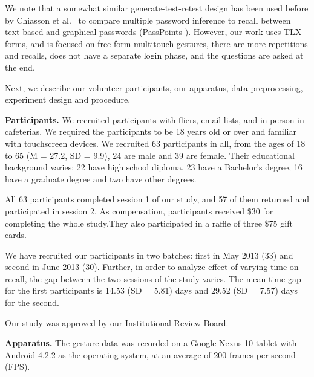 \documentclass{sig-alternate-10pt}
\begin{document}
We note that a somewhat similar generate-test-retest design has been used before by Chiasson et al.~\cite{Chiasson:2009:MPI:1653662.1653722} to compare multiple password inference to recall between text-based and graphical passwords (PassPoints \cite{Wiedenbeck:2005:PDL:1090412.1090418}). However, our work uses TLX forms, and is focused on free-form multitouch gestures, there are more repetitions and recalls, does not have a separate login phase, and the questions are asked at the end.

Next, we describe our volunteer participants, our apparatus, data preprocessing, experiment design and procedure.

\textbf{Participants.} We recruited participants with fliers, email lists, and in person in cafeterias. We required the participants to be 18 years old or over and familiar with touchscreen devices. We recruited 63 participants in all, from the ages of 18 to 65 (M = 27.2, SD = 9.9), 24 are male and 39 are female. Their educational background varies: 22 have high school diploma, 23 have a Bachelor's degree, 16 have a graduate degree and two have other degrees. 

All 63 participants completed session 1 of our study, and 57 of them returned and participated in session 2.
As compensation, participants received \$30 for completing the whole study.They also participated in a raffle of three \$75 gift cards.

We have recruited our participants in two batches: first in May 2013 (33) and second in June 2013 (30). Further, in order to analyze effect of varying time on recall, the gap between the two sessions of the study varies. The mean time gap for the first participants is 14.53 (SD = 5.81) days and 29.52 (SD = 7.57) days for the second.


Our study was approved by our Institutional Review Board.




\textbf{Apparatus.} The gesture data was recorded on a Google Nexus 10 tablet with Android 4.2.2 as the operating system, at an average of 200 frames per second (FPS).
\end{document}
